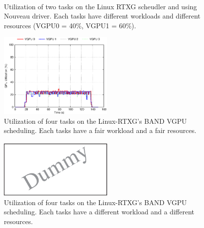 \begin{figure}[!t]
\begin{center}
\label{fig:fifo_rtx} \\
\label{fig:band_rtx}
\caption{Utilization of two tasks on the Linux RTXG scheudler and using Nouveau driver. Each tasks have different workloads and different resources (VGPU0 = 40\%, VGPU1 = 60\%).}
\label{fig:rtx_nouveau}
\end{center}
\end{figure}

\begin{figure}[t]
\begin{center}
\includegraphics[width=0.5\textwidth]{img/band_rtx_fair}
\caption{Utilization of four tasks on the Linux-RTXG's BAND VGPU scheduling. Each tasks have a fair workload and a fair resources.}
\label{fig:band_rtx_fair}
\end{center}
\end{figure}

\begin{figure}[t]
\begin{center}
\includegraphics[width=0.5\textwidth]{img/band_rtx_diff}
\caption{Utilization of four tasks on the Linux-RTXG's BAND VGPU scheduling. Each tasks have a different workload and a different resources.}
\end{center}
\label{fig:band_rtx}
\end{figure}
\fi

